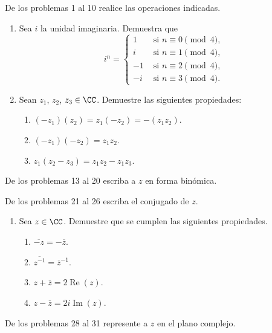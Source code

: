 \noindent De los problemas 1 al 10 realice las operaciones indicadas.
\begin{multienumerate}
\end{multienumerate}
\begin{enumerate}[start=11]
    \item Sea $i$ la unidad imaginaria. Demuestra que
    $$i^n = \begin{cases}
        1 & \text{ si } n \equiv 0 \pmod{4}, \\
        i & \text{ si } n \equiv 1 \pmod{4}, \\
        -1 & \text{ si } n \equiv 2 \pmod{4}, \\
        -i & \text{ si } n \equiv 3 \pmod{4}.
    \end{cases}$$
    \item Sean $z_1$, $z_2$, $z_3 \in \CC$. Demuestre las siguientes propiedades:
    \begin{enumerate}
        \item $(-z_1)(z_2) = z_1(-z_2) = -(z_1z_2)$.
        \item $(-z_1)(-z_2) = z_1z_2$.
        \item $z_1(z_2-z_3) = z_1z_2 - z_1z_3$.
    \end{enumerate}
\end{enumerate}
De los problemas 13 al 20 escriba a $z$ en forma binómica.
\begin{multienumerate}\setcounter{multienumi}{12}
\end{multienumerate}
De los problemas 21 al 26 escriba el conjugado de $z$.
\begin{multienumerate}\setcounter{multienumi}{20}
\end{multienumerate}
\begin{enumerate}[start=27]
    \item Sea $z \in \CC$. Demuestre que se cumplen las siguientes propiedades.
    \begin{enumerate}
        \item $\overline{-z} = -\overline{z}$.
        \item $\overline{z^{-1}} = \overline{z}^{-1}$.
        \item $z + \overline{z} = 2\operatorname{Re}(z)$.
        \item $z - \overline{z} = 2i\operatorname{Im}(z)$.
    \end{enumerate}
\end{enumerate}
De los problemas 28 al 31 represente a $z$ en el plano complejo.
\begin{multienumerate}\setcounter{multienumi}{27}
\end{multienumerate}


